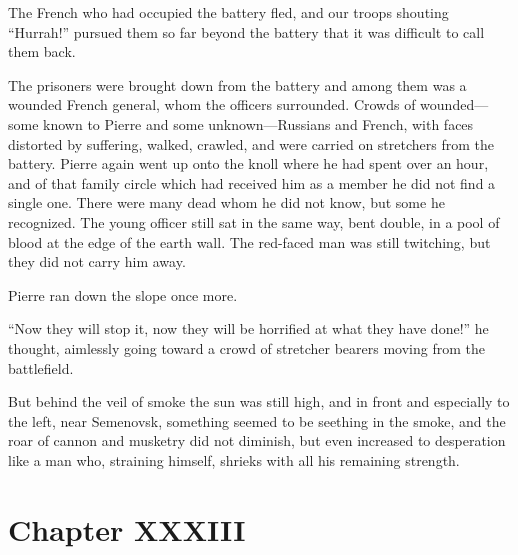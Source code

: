 The French who had occupied the battery fled, and our troops
shouting ``Hurrah!'' pursued them so far beyond the battery that
it was difficult to call them back.

The prisoners were brought down from the battery and among them
was a wounded French general, whom the officers
surrounded. Crowds of wounded---some known to Pierre and some
unknown---Russians and French, with faces distorted by suffering,
walked, crawled, and were carried on stretchers from the
battery. Pierre again went up onto the knoll where he had spent
over an hour, and of that family circle which had received him as
a member he did not find a single one. There were many dead whom
he did not know, but some he recognized. The young officer still
sat in the same way, bent double, in a pool of blood at the edge
of the earth wall.  The red-faced man was still twitching, but
they did not carry him away.

Pierre ran down the slope once more.

``Now they will stop it, now they will be horrified at what they
have done!'' he thought, aimlessly going toward a crowd of
stretcher bearers moving from the battlefield.

But behind the veil of smoke the sun was still high, and in front
and especially to the left, near Semenovsk, something seemed to
be seething in the smoke, and the roar of cannon and musketry did
not diminish, but even increased to desperation like a man who,
straining himself, shrieks with all his remaining strength.


\chapter*{Chapter XXXIII} \ifaudio {}
\fi

